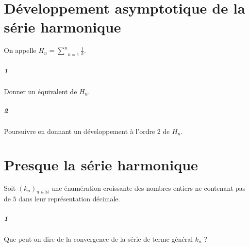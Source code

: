 \documentclass[10pt,a4paper]{article}
\begin{document}
\section{Développement asymptotique de la série harmonique}
On appelle $H_n= \underset{k=1}{\overset{n}{\sum}}\frac{1}{k}$.
\subparagraph{1}Donner un équivalent de $H_n$.
\subparagraph{2}Poursuivre en donnant un développement à l'ordre 2 de $H_n$.

\section{Presque la série harmonique}
Soit $(k_n)_{n \in \mathbb{N}}$ une énumération croissante des nombres entiers ne contenant pas de $5$ dans leur représentation décimale.
\subparagraph{1}Que peut-on dire de la convergence de la série de terme général $k_n$ ?
\end{document}
